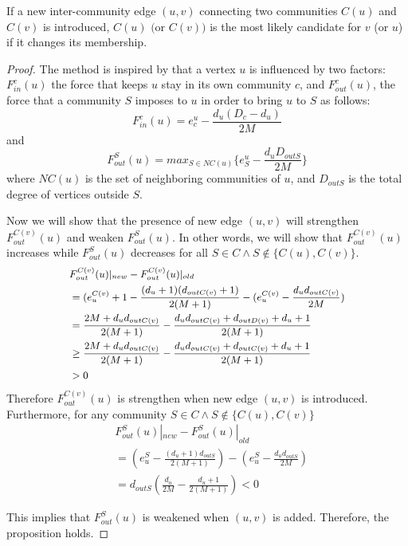 \begin{prop}\label{3}
If a new inter-community edge $(u,v)$ connecting two communities $C(u)$ and $C(v)$ is introduced, $C(u)$ $($or $C(v))$ is the most likely candidate for $v$ (or $u$) if it changes its membership.
\end{prop}


\begin{proof}
The method is inspired by \cite{PhysRevE.78.046115} that a vertex $u$ is influenced by two factors: $F^c_{in}(u)$ the force that keeps $u$ stay in its own community $c$, and $F^c_{out}(u)$, the force that a community $S$ imposes to $u$ in order to bring $u$ to $S$ as follows:
\[
F^c_{in}(u)=e_c^u-\frac{d_u(D_c-d_u)}{2M}
\]
and 
\[
F^S_{out}(u)=max_{S\in NC(u)} \{e_S^u - \frac{d_u D_{outS}}{2M}\}
\]
where $NC(u)$ is the set of neighboring communities of $u$, and $D_{outS}$ is the total degree of vertices outside $S$.

Now we will show that the presence of new edge $(u,v)$ will strengthen $F^{C(v)}_{out}(u)$ and weaken $F^S_{out}(u)$. In other words, we will show that $F^{C(v)}_{out}(u)$ increases while $F^S_{out}(u)$ decreases for all $S \in C \wedge S \notin \{C(u),C(v)\}$.
\[\small
\begin{split}
&F^{C(v)}_{out}(u)|_{new} - F^{C(v)}_{out}(u)|_{old}\\
&=(e_u^{C(v)}+1-\frac{(d_u+1)(d_{outC(v)}+1)}{2(M+1)} - (e_u^{C(v)} - \frac{d_ud_{outC(v)}}{2M})\\
&= \frac{2M+d_ud_{outC(v)}}{2(M+1)} - \frac{d_ud_{outC(v)}+d_{outD(v)}+d_u+1}{2(M+1)}\\
&\geq \frac{2M+d_ud_{outC(v)}}{2(M+1)} - \frac{d_u d_{outC(v)}+d_{outC(v)}+d_u+1}{2(M+1)}\\
&>0
\end{split}
\]
Therefore $F^{C(v)}_{out}(u)$ is strengthen when new edge $(u,v)$ is introduced. Furthermore, for any community $S\in C \wedge S\notin \{C(u),C(v)\}$
\[
\begin{split}
& F^{S}_{out}(u)|_{new} - F^{S}_{out}(u)|_{old}\\
&= (e^S_u-\frac{(d_u+1)d_{outS}}{2(M+1)}) - (e^S_u - \frac{d_ud_{outS}}{2M})\\
&= d_{outS}(\frac{d_u}{2M} - \frac{d_u+1}{2(M+1)})<0
\end{split}
\]

This implies that $F^S_{out}(u)$ is weakened when $(u,v)$ is added. Therefore,  the proposition holds.
\end{proof}





